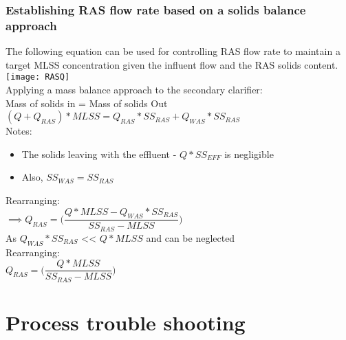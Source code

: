 		\subsubsection{Establishing RAS flow rate based on a solids balance approach}
%
The following equation can be used for controlling RAS flow rate to maintain a target MLSS concentration given the influent flow and the RAS solids content.\\
\vspace{0.3cm}
\texttt{[image: RASQ]}\\
Applying a mass balance approach to the secondary clarifier:\\
Mass of solids in = Mass of solids Out\\
$(Q + Q_{RAS})* MLSS = Q_{RAS} *SS_{RAS} + Q_{WAS} *SS_{RAS}$\\
Notes:
\begin{itemize}
\item The solids leaving with the effluent - $Q*SS_{EFF}$ is negligible\\
\item Also, $SS_{WAS}=SS_{RAS}$ \\
\end{itemize}
Rearranging:\\
$ \implies Q_{RAS} = \Bigg(\dfrac{Q*MLSS - Q_{WAS} * SS_{RAS}}{SS_{RAS} - MLSS}\Bigg)$\\
As $Q_{WAS}*SS_{RAS}$ << $Q*MLSS$ and can be neglected\\
Rearranging:\\
$Q_{RAS} = \Bigg(\dfrac{Q*MLSS}{SS_{RAS} - MLSS}\Bigg)$ 


\section{Process trouble shooting}

